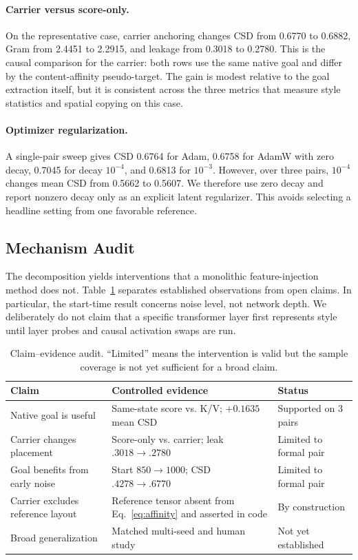 \documentclass[10pt,letterpaper]{article}
\begin{document}
\paragraph{Carrier versus score-only.}
On the representative case, carrier anchoring changes CSD from 0.6770 to
0.6882, Gram from 2.4451 to 2.2915, and leakage from 0.3018 to 0.2780. This is
the causal comparison for the carrier: both rows use the same native goal and
differ by the content-affinity pseudo-target. The gain is modest relative to
the goal extraction itself, but it is consistent across the three metrics that
measure style statistics and spatial copying on this case.

\paragraph{Optimizer regularization.}
A single-pair sweep gives CSD 0.6764 for Adam, 0.6758 for AdamW with zero decay,
0.7045 for decay $10^{-4}$, and 0.6813 for $10^{-3}$. However, over three pairs,
$10^{-4}$ changes mean CSD from 0.5662 to 0.5607. We therefore use zero decay
and report nonzero decay only as an explicit latent regularizer. This avoids
selecting a headline setting from one favorable reference.

\subsection{Mechanism Audit}

The decomposition yields interventions that a monolithic feature-injection
method does not. Table~\ref{tab:claims} separates established observations from
open claims. In particular, the start-time result concerns noise level, not
network depth. We deliberately do not claim that a specific transformer layer
first represents style until layer probes and causal activation swaps are run.

\begin{table}[t]
\centering
\caption{Claim--evidence audit. ``Limited'' means the intervention is valid but
the sample coverage is not yet sufficient for a broad claim.}
\label{tab:claims}
\small
\setlength{\tabcolsep}{3pt}
\begin{tabular}{p{}p{}p{}}
\toprule
Claim & Controlled evidence & Status\\
\midrule
Native goal is useful & Same-state score vs. K/V; $+0.1635$ mean CSD & Supported on 3 pairs\\
Carrier changes placement & Score-only vs. carrier; leak $.3018\!\to\!.2780$ & Limited to formal pair\\
Goal benefits from early noise & Start $850\!\to\!1000$; CSD $.4278\!\to\!.6770$ & Limited to formal pair\\
Carrier excludes reference layout & Reference tensor absent from Eq.~\ref{eq:affinity} and asserted in code & By construction\\
Broad generalization & Matched multi-seed and human study & Not yet established\\
\bottomrule
\end{tabular}
\end{table}
\end{document}
